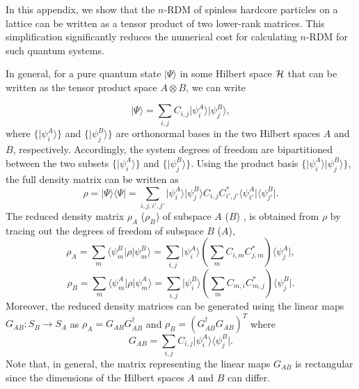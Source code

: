 In this appendix, we show that the $n$-RDM of spinless hardcore particles on
a lattice can be written as a tensor product of two lower-rank matrices. This
simplification significantly reduces the numerical cost for calculating $n$-RDM
for such quantum systems. 

In general, for a pure quantum state $\vert \Psi\rangle$ in some
Hilbert space $\cal H$ that can be written as the tensor product space $A \otimes
B$, we can write

\begin{equation}
 \vert \Psi\rangle = \sum_{i,j} C_{i,j} \vert \psi^A_i\rangle  \vert \psi^B_j\rangle
\label{state_decomposition},
\end{equation}
where $\{\vert \psi^A_i\rangle\}$ and $\{\vert \psi^B_j\rangle\}$ are
orthonormal bases in the two Hilbert spaces $A$ and $B$, respectively.
Accordingly, the system degrees of freedom are bipartitioned between the two
subsets  $\{\vert \psi^A_i\rangle\}$ and $\{\vert \psi^B_j\rangle\}$. Using the
product basis $\{\vert \psi^A_i\rangle\vert  \psi^B_j\rangle\}$, the full
density matrix can be written as \begin{equation}
\rho=\vert \Psi\rangle\langle\Psi\vert = \sum_{i,j,i',j'}  \vert \psi^A_i\rangle  \vert \psi^B_j\rangle C_{i,j}C^*_{i',j'} \langle\psi^A_{i'}\vert \langle\psi^B_{j'}\vert 
\label{full_density_matrix}.
\end{equation}
The reduced density matrix $\rho_A$ ($\rho_B$) of subspace $A$ ($B$) , is obtained from $\rho$ by tracing out the degrees of freedom of subspace $B$ ($A$), 
\begin{equation}
\rho_A=\sum_{m}\langle\psi^B_m\vert \rho \vert \psi^B_m\rangle= \sum_{i,j}  \vert \psi^A_i\rangle \left(\sum_{m}C_{i,m}C^*_{j,m}\right) \langle\psi^A_{j}\vert 
\label{rho_1_full},
\end{equation}
\begin{equation}
\rho_B=\sum_{m}\langle\psi^A_m\vert \rho \vert \psi^A_m\rangle= \sum_{i,j}  \vert \psi^B_i\rangle \left(\sum_{m}C_{m,i}C^*_{m,j}\right) \langle\psi^B_{j}\vert 
\label{rho_2_full}.
\end{equation}
 Moreover,  the reduced density matrices can be generated using the linear maps $G_{AB}:S_B\rightarrow S_A$ as  $\rho_A=G_{AB}G_{AB}^\dagger$ and $\rho_B=(G_{AB}^\dagger G_{AB})^T$
where
\begin{equation}
G_{AB}=\sum_{i,j}C_{i,j}\vert \psi^A_i\rangle\langle\psi^B_j\vert 
\label{D_1}.
\end{equation}
Note that, in general, the matrix representing the linear maps $G_{AB}$ is
rectangular since the dimensions of the Hilbert spaces $A$ and $B$ can differ.

